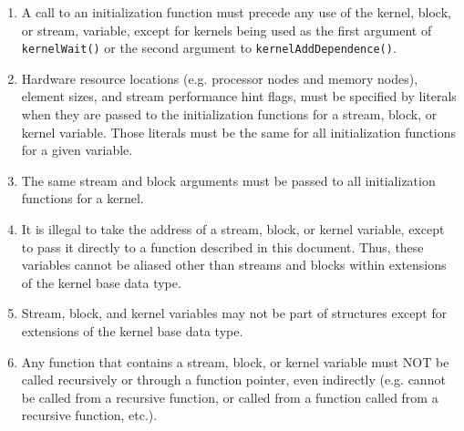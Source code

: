\begin{enumerate}

\item A call to an initialization function must precede any use of the kernel, block, or stream, variable, except for kernels being used as the first argument of {\tt kernelWait()} or the second argument to {\tt kernelAddDependence()}. 

\item Hardware resource locations (e.g. processor nodes and memory nodes), element sizes, and stream performance hint flags, must be specified by literals when they are passed to the initialization functions for a stream, block, or kernel variable. Those literals must be the same for all initialization functions for a given variable.

\item The same stream and block arguments must be passed to all initialization functions for a kernel.

\item It is illegal to take the address of a stream, block,
or kernel variable, except to pass it directly to a function described in this document. Thus, these variables cannot be aliased other than streams and blocks within extensions of the kernel base data type.

\item Stream, block, and kernel variables may not be part
of structures except for extensions of the kernel base data type.

\item Any function that contains a stream, block, or kernel variable 
must NOT be called recursively or through a function pointer, even indirectly (e.g. cannot be called from a recursive function, 
or called from a function called from a recursive function, etc.).

\end{enumerate}
